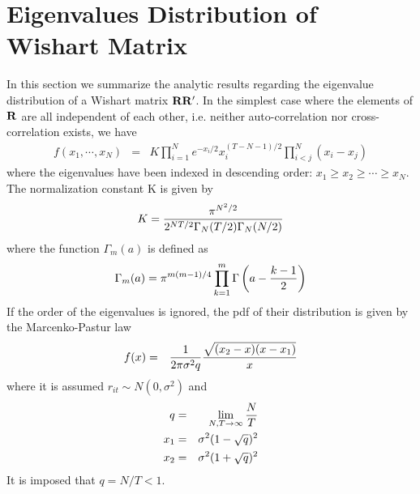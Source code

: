
\chapter{Eigenvalues Distribution of Wishart Matrix}
\label{sec:wishart_eigen_dist}
In this section we summarize the analytic results regarding the
eigenvalue distribution of a Wishart matrix $\mathbf{RR'}$. In the
simplest case where the elements of $\mathbf{R}$ are all independent of
each other, i.e. neither auto-correlation nor cross-correlation
exists, we have \cite{Chiani2012}
\begin{eqnarray}
  f(x_1, \cdots, x_N) &=& K \prod_{i=1}^N e^{-x_i/2}
  x_i^{(T-N-1)/2} \prod_{i<j}^N (x_i -
  x_j) \label{eq:wishart_eigen_pdf}
\end{eqnarray}
where the eigenvalues have been indexed in descending order: $x_1 \geq
x_2 \geq \cdots \geq x_N$. The normalization constant K is given by
\begin{equation*}
  K = {\pi^{N^2/2} \over 2^{NT/2}\Gamma_N(T/2) \Gamma_N(N/2)}
\end{equation*}
where the function $\Gamma_m(a)$ is defined as
\begin{equation*}
  \Gamma_m(a) = \pi^{m(m-1)/4} \prod_{k=1}^m \Gamma\left(a - {k-1
      \over 2}\right)
\end{equation*}
If the order of the eigenvalues is ignored, the \gls{pdf} of their
distribution is given by the Marcenko-Pastur law \cite{Guhr2007}
\begin{eqnarray}
  f(x) &=& {1 \over 2\pi \sigma^2 q} {
    \sqrt{(x_2 - x)(x - x_1)} \over x
  } \label{eq:MP_pdf}
\end{eqnarray}
where it is assumed $r_{it} \sim N(0, \sigma^2)$ and
\begin{eqnarray*}
  q &=& \lim_{N,T \to \infty} {N \over T} \\
  x_1 &=& \sigma^2 (1 - \sqrt q)^2 \\
  x_2 &=& \sigma^2 (1 + \sqrt q)^2 \\
\end{eqnarray*}
It is imposed that $q = N/T < 1$.

